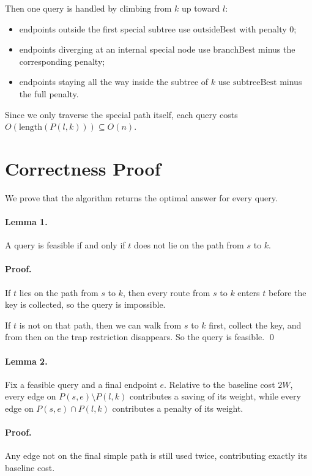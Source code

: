 \documentclass[11pt]{article}
\begin{document}
Then one query is handled by climbing from $k$ up toward $l$:
\begin{itemize}[leftmargin=*]
    \item endpoints outside the first special subtree use $\text{outsideBest}$ with penalty $0$;
    \item endpoints diverging at an internal special node use $\text{branchBest}$ minus the corresponding
    penalty;
    \item endpoints staying all the way inside the subtree of $k$ use $\text{subtreeBest}$ minus the full
    penalty.
\end{itemize}

Since we only traverse the special path itself, each query costs $O(\text{length}(P(l,k))) \subseteq O(n)$.

\section*{Correctness Proof}

We prove that the algorithm returns the optimal answer for every query.

\paragraph{Lemma 1.}
A query is feasible if and only if $t$ does not lie on the path from $s$ to $k$.

\paragraph{Proof.}
If $t$ lies on the path from $s$ to $k$, then every route from $s$ to $k$ enters $t$ before the key is
collected, so the query is impossible.

If $t$ is not on that path, then we can walk from $s$ to $k$ first, collect the key, and from then on the
trap restriction disappears. So the query is feasible. \qed

\paragraph{Lemma 2.}
Fix a feasible query and a final endpoint $e$. Relative to the baseline cost $2W$, every edge on
$P(s,e) \setminus P(l,k)$ contributes a saving of its weight, while every edge on
$P(s,e) \cap P(l,k)$ contributes a penalty of its weight.

\paragraph{Proof.}
Any edge not on the final simple path is still used twice, contributing exactly its baseline cost.
\end{document}

